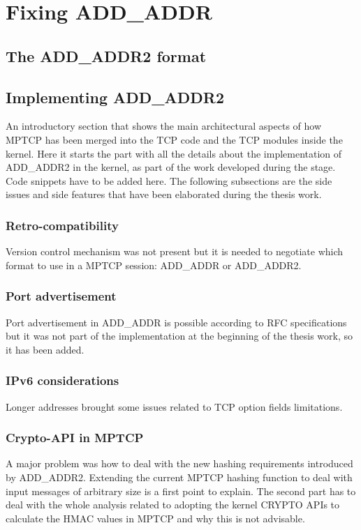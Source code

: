 \chapter{Fixing ADD\_ADDR}
\label{chap:addaddr2}

\section{The ADD\_ADDR2 format}


\section{Implementing ADD\_ADDR2}
An introductory section that shows the main architectural aspects of how MPTCP has been merged into the TCP code and the TCP modules inside the kernel.
Here it starts the part with all the details about the implementation of ADD\_ADDR2 in the kernel, as part of the work developed during the stage. Code snippets have to be added here. The following subsections are the side issues and side features that have been elaborated during the thesis work.

\subsection{Retro-compatibility}
Version control mechanism was not present but it is needed to negotiate which format to use in a MPTCP session: ADD\_ADDR or ADD\_ADDR2.

\subsection{Port advertisement}
Port advertisement in ADD\_ADDR is possible according to RFC specifications but it was not part of the implementation at the beginning of the thesis work, so it has been added.

\subsection{IPv6 considerations}
Longer addresses brought some issues related to TCP option fields limitations.

\subsection{Crypto-API in MPTCP}
A major problem was how to deal with the new hashing requirements introduced by ADD\_ADDR2. Extending the current MPTCP hashing function to deal with input messages of arbitrary size is a first point to explain. The second part has to deal with the whole analysis related to adopting the kernel CRYPTO APIs to calculate the HMAC values in MPTCP and why this is not advisable.

